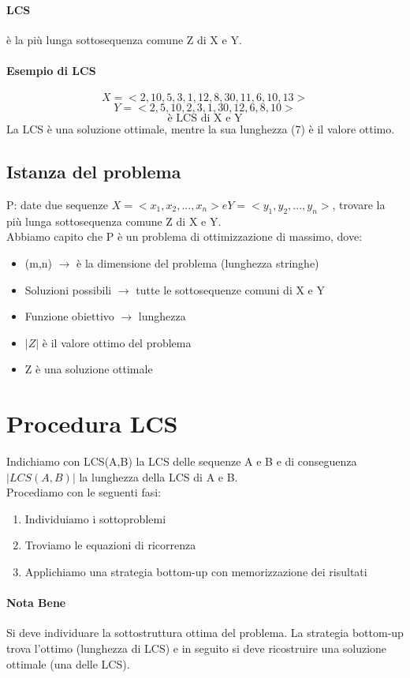 \paragraph*{LCS} è la più lunga sottosequenza comune Z di X e Y.
\paragraph*{Esempio di LCS}
\[X = <2, 10, 5, 3, 1, 12, 8, 30, 11, 6, 10, 13>\]
\[Y = <2, 5, 10, 2, 3, 1, 30, 12, 6, 8, 10>\]
\[<2, 10, 3, 1, 12, 8, 10> \text{è LCS di X e Y}\]
La LCS è una soluzione ottimale, mentre la sua lunghezza (7) è il valore ottimo.\\
\subsection{Istanza del problema}
P: date due sequenze $X = <x_1, x_2, ..., x_n> e Y = <y_1, y_2, ... , y_n>$, trovare la più lunga
sottosequenza comune Z di X e Y.\\
Abbiamo capito che P è un problema di ottimizzazione di massimo, dove:
\begin{itemize}
    \item (m,n) $\rightarrow$ è la dimensione del problema (lunghezza stringhe)
    \item Soluzioni possibili $\rightarrow$ tutte le sottosequenze comuni di X e Y
    \item Funzione obiettivo $\rightarrow$ lunghezza
    \item $|Z|$ è il valore ottimo del problema
    \item Z è una soluzione ottimale
\end{itemize}
\section{Procedura LCS}
Indichiamo con LCS(A,B) la LCS delle sequenze A e B e di conseguenza $|LCS(A,B)|$
 la lunghezza della LCS di A e B.\\
 Procediamo con le seguenti fasi:
 \begin{enumerate}
    \item Individuiamo i sottoproblemi
    \item Troviamo le equazioni di ricorrenza
    \item Applichiamo una strategia bottom-up con memorizzazione dei risultati
 \end{enumerate}
 \paragraph*{Nota Bene} Si deve individuare la sottostruttura ottima del problema. La strategia bottom-up trova
 l'ottimo (lunghezza di LCS) e in seguito si deve ricostruire una soluzione ottimale (una delle LCS).
